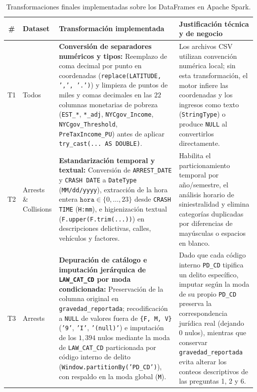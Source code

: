 \begin{table}[H]
\centering
\scriptsize
\renewcommand{\arraystretch}{1.25}
\caption{Transformaciones finales implementadas sobre los DataFrames en Apache Spark.}
\label{tab:transformaciones_finales}
\begin{tabularx}{\linewidth}{c l >{\raggedright\arraybackslash}p{4.3cm} X}
\toprule
\textbf{\#} & \textbf{Dataset} & \textbf{Transformación implementada} & \textbf{Justificación técnica y de negocio} \\
\midrule
T1 & Todos & \textbf{Conversión de separadores numéricos y tipos:} Reemplazo de coma decimal por punto en coordenadas (\texttt{replace(LATITUDE, ',', '.')}) y limpieza de puntos de miles y comas decimales en las $22$ columnas monetarias de pobreza (\texttt{EST\_*}, \texttt{*\_adj}, \texttt{NYCgov\_Income}, \texttt{NYCgov\_Threshold}, \texttt{PreTaxIncome\_PU}) antes de aplicar \texttt{try\_cast(... AS DOUBLE)}. & Los archivos CSV utilizan convención numérica local; sin esta transformación, el motor infiere las coordenadas y los ingresos como texto (\texttt{StringType}) o produce \texttt{NULL} al convertirlos directamente. \\
T2 & Arrests \& Collisions & \textbf{Estandarización temporal y textual:} Conversión de \texttt{ARREST\_DATE} y \texttt{CRASH DATE} a \texttt{DateType} (\texttt{MM/dd/yyyy}), extracción de la hora entera $\texttt{hora} \in \{0,\dots,23\}$ desde \texttt{CRASH TIME} (\texttt{H:mm}), e higienización textual (\texttt{F.upper(F.trim(...))}) en descripciones delictivas, calles, vehículos y factores. & Habilita el particionamiento temporal por año/semestre, el análisis horario de siniestralidad y elimina categorías duplicadas por diferencias de mayúsculas o espacios en blanco. \\
T3 & Arrests & \textbf{Depuración de catálogo e imputación jerárquica de \texttt{LAW\_CAT\_CD} por moda condicionada:} Preservación de la columna original en \texttt{gravedad\_reportada}; recodificación a \texttt{NULL} de valores fuera de \texttt{\{F, M, V\}} (\texttt{'9'}, \texttt{'I'}, \texttt{'(null)'}) e imputación de los $1,394$ nulos mediante la moda de \texttt{LAW\_CAT\_CD} particionada por código interno de delito (\texttt{Window.partitionBy('PD\_CD')}), con respaldo en la moda global (\texttt{M}). & Dado que cada código interno \texttt{PD\_CD} tipifica un delito específico, imputar según la moda de su propio \texttt{PD\_CD} preserva la correspondencia jurídica real (dejando $0$ nulos), mientras que conservar \texttt{gravedad\_reportada} evita alterar los conteos descriptivos de las preguntas 1, 2 y 6. \\

\end{tabularx}
\end{table}
